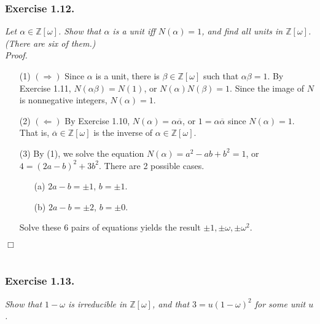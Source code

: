 \documentclass{article}
\begin{document}



\subsubsection*{Exercise 1.12.}
\emph{Let $\alpha \in \mathbb{Z}[\omega]$.
Show that $\alpha$ is a unit iff $N(\alpha) = 1$,
and find all units in $\mathbb{Z}[\omega]$.
(There are six of them.)} \\

\emph{Proof.}
\begin{enumerate}
\item[(1)]
$(\Longrightarrow)$
Since $\alpha$ is a unit, there is $\beta \in \mathbb{Z}[\omega]$ such that
$\alpha \beta = 1$.
By Exercise 1.11, $N(\alpha \beta) = N(1)$, or $N(\alpha) N(\beta) = 1$.
Since the image of $N$ is nonnegative integers, $N(\alpha) = 1$.
\item[(2)]
$(\Longleftarrow)$
By Exercise 1.10, $N(\alpha) = \alpha \overline{\alpha}$,
or $1 = \alpha \overline{\alpha}$ since $N(\alpha) = 1$.
That is, $\overline{\alpha} \in \mathbb{Z}[\omega]$ is
the inverse of $\alpha \in \mathbb{Z}[\omega]$.
\item[(3)]
By (1), we solve the equation $N(\alpha) = a^2 - ab + b^2 = 1$,
or $4 = (2a-b)^2 + 3b^2$.
There are 2 possible cases.
  \begin{enumerate}
  \item[(a)]
  $2a-b = \pm 1$, $b = \pm 1$.
  \item[(b)]
  $2a-b = \pm 2$, $b = \pm 0$.
  \end{enumerate}
  Solve these 6 pairs of equations yields the result
  $\pm 1, \pm \omega, \pm \omega^2$.
\end{enumerate}
$\Box$ \\\\






\subsubsection*{Exercise 1.13.}
\emph{Show that $1-\omega$ is irreducible in $\mathbb{Z}[\omega]$,
and that $3 = u(1-\omega)^2$ for some unit $u$. } \\
\end{document}
